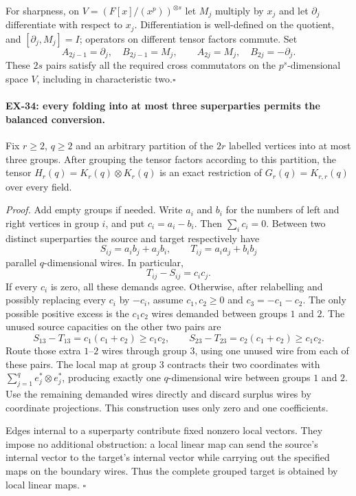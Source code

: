 For sharpness, on
$V=(F[x]/(x^p))^{\otimes s}$ let $M_j$ multiply by
$x_j$ and let $\partial_j$ differentiate with respect to
$x_j$. Differentiation is well-defined on the quotient,
and $[\partial_j,M_j]=I$; operators on different tensor
factors commute. Set
\[
 A_{2j-1}=\partial_j,\quad B_{2j-1}=M_j,
 \qquad A_{2j}=M_j,\quad B_{2j}=-\partial_j.
\]
These $2s$ pairs satisfy all the required cross commutators
on the $p^s$-dimensional space $V$, including in
characteristic two.\hfill$\square$

\paragraph{EX-34: every folding into at most three superparties permits the balanced conversion.}
Fix $r\ge2$, $q\ge2$ and an arbitrary partition of the $2r$
labelled vertices into at most three groups. After grouping the
tensor factors according to this partition, the tensor
$H_r(q)=K_r(q)\otimes K_r(q)$ is an exact restriction of
$G_r(q)=K_{r,r}(q)$ over every field.

\emph{Proof.}
Add empty groups if needed. Write $a_i$ and $b_i$ for the
numbers of left and right vertices in group $i$, and put
$c_i=a_i-b_i$. Then $\sum_i c_i=0$. Between two distinct
superparties the source and target respectively have
\[
 S_{ij}=a_i b_j+a_j b_i,\qquad
 T_{ij}=a_i a_j+b_i b_j
\]
parallel $q$-dimensional wires. In particular,
\[
 T_{ij}-S_{ij}=c_i c_j.
 \tag{EX34.1}
\]
If every $c_i$ is zero, all these demands agree. Otherwise,
after relabelling and possibly replacing every $c_i$ by
$-c_i$, assume $c_1,c_2\ge0$ and
$c_3=-c_1-c_2$. The only possible positive excess is the
$c_1c_2$ wires demanded between groups $1$ and $2$.
The unused source capacities on the other two pairs are
\[
 S_{13}-T_{13}=c_1(c_1+c_2)\ge c_1c_2,
 \qquad
 S_{23}-T_{23}=c_2(c_1+c_2)\ge c_1c_2.
\]
Route those extra $1$--$2$ wires through group $3$, using
one unused wire from each of these pairs. The local map at
group $3$ contracts their two coordinates with
$\sum_{j=1}^q e_j^*\otimes e_j^*$, producing exactly one
$q$-dimensional wire between groups $1$ and $2$.
Use the remaining demanded wires directly and discard
surplus wires by coordinate projections. This construction
uses only zero and one coefficients.

Edges internal to a superparty contribute fixed nonzero
local vectors. They impose no additional obstruction:
a local linear map can send the source's internal vector
to the target's internal vector while carrying out the
specified maps on the boundary wires. Thus the complete
grouped target is obtained by local linear maps.
\hfill$\square$

